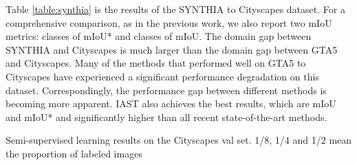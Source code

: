 \documentclass[runningheads]{llncs}
\begin{document}
Table \ref{table:synthia} is the results of the SYNTHIA to Cityscapes dataset. For a comprehensive comparison, as in the previous work, we also report two mIoU metrics:  classes of mIoU* and  classes of mIoU. The domain gap between SYNTHIA and Cityscapes is much larger than the domain gap between GTA5 and Cityscapes. Many of the methods that performed well on GTA5 to Cityscapes have experienced a significant performance degradation on this dataset. Correspondingly, the performance gap between different methods is becoming more apparent. IAST also achieves the best results, which are  mIoU and  mIoU* and significantly higher than all recent state-of-the-art methods.


\begin{table}
\small
\parbox{.40\linewidth}{
\centering
\caption{Semi-supervised learning results on the Cityscapes val set. 1/8, 1/4 and 1/2 mean the proportion of labeled images}

\label{table:semi}
}
\hfill
\parbox{.55\linewidth}{
\centering
\caption{Extension analysis, applying IAST to non-self-learning UDA methods \cite{tsai2018learning,vu2019advent} (test on Cityscapes), and \emph{Source} means training IAST without warmup}

}
\end{table}
\end{document}
